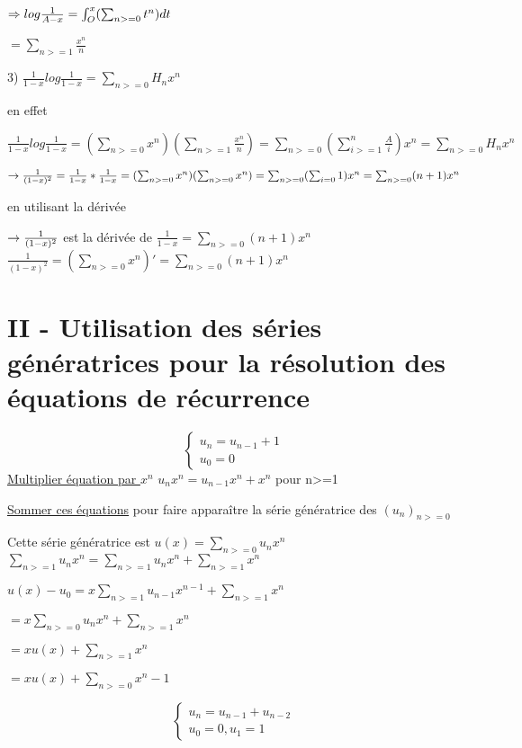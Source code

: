 $\Rightarrow log \frac{1}{A-x} = \int_O^x (\sum_{n>=0}t^n)dt$

$= \sum_{n>=1}\frac{x^n}{n}$

3) $\frac{1}{1-x}log \frac{1}{1-x} = \sum_{n>=0}H_nx^n$

en effet

$\frac{1}{1-x}log \frac{1}{1-x} = (\sum_{n>=0}x^n)(\sum_{n>=1}\frac{x^n}{n})
= \sum_{n>=0}(\sum_{i>=1}^n \frac{A}{i})x^n = \sum_{n>=0}H_nx^n$

$\rightarrow \frac{1}{(1-x)^2} = \frac{1}{1-x} * \frac{1}{1-x} = (\sum_{n>=0}^{}x^n)(\sum_{n>=0}^{}x^n) = \sum_{n>=0}^{}(\sum_{i=0}^{}1)x^n = \sum_{n>=0}^{}(n+1)x^n$


en utilisant la dérivée

$\rightarrow \frac{1}{(1-x)^2}$ est la dérivée de $\frac{1}{1-x} = \sum_{n>=0}^{}(n+1)x^n$\\

$\frac{1}{(1-x)^2} = (\sum_{n>=0}^{}x^n)' = \sum_{n>=0}^{}(n+1)x^n$

\section{II - Utilisation des séries génératrices pour la résolution des équations de récurrence}

\exemple
\[\begin{cases}
u_n = u_{n-1} +1\\
u_0 = 0
\end{cases}\]
\underline{Multiplier équation par $x^n$}
$u_nx^n = u_{n-1}x^n + x^n $ pour n>=1

\underline{Sommer ces équations} pour faire apparaître la série génératrice des $(u_n)_{n>=0}$

Cette série génératrice est $u(x) = \sum_{n>=0}^{}u_nx^n$
$\sum_{n>=1}^{}u_nx^n = \sum_{n>=1}^{}u_nx^n  + \sum_{n>=1}^{}x^n$

$u(x) - u_0 = x \sum_{n>=1}^{}u_{n-1}x^{n-1} + \sum_{n>=1}^{}x^{n}$

$= x \sum_{n>=0}^{}u_{n}x^{n} + \sum_{n>=1}^{}x^{n}$

$= xu(x) + \sum_{n>=1}^{}x^{n}$

$= xu(x) + \sum_{n>=0}^{}x^{n}-1$

\[\begin{cases}
u_n = u_{n-1} + u_{n-2}\\
u_0 = 0, u_1 = 1
\end{cases}\]

